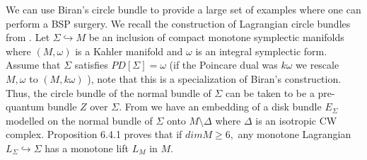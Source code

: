 \documentclass[11pt, oneside,dvipsnames]{amsart}
\newcommand{\<}{\langle}
\renewcommand{\>}{\rangle}
\newcommand{\bP}{\mathbb{P}}
\newcommand{\sm}{\ensuremath{\setminus}}
\newcommand{\abc}{{(a,b,c)}}
\newtheorem{prop}[Theorem]{Proposition}
\theoremstyle{definition}
\theoremstyle{definition}
\numberwithin{equation}{subsection}
\begin{document}

We can  use Biran's circle bundle to provide a large set of examples where one can perform a BSP surgery. We recall the construction of Lagrangian circle bundles from  \cite{b06,bc09}. Let $\Sigma \hookrightarrow M$ be an inclusion of compact monotone symplectic manifolds where $(M,\omega)$ is a Kahler manifold and $\omega$ is an integral symplectic form. Assume that $\Sigma$ satisfies $PD[\Sigma] = \omega$ (if the Poincare dual was $k\omega$ we  rescale $M,\omega$ to $(M,k\omega)$ ), note that this is a specialization of Biran's construction. Thus, the circle bundle of the normal bundle of $\Sigma$ can be taken to be a pre-quantum bundle $Z$ over $\Sigma.$ From \cite{b06} we have an embedding of a disk bundle $E_\Sigma$ modelled on the normal bundle of $\Sigma$ onto $M\sm \Delta$ where $\Delta$ is an isotropic CW complex. Proposition 6.4.1 \cite{bc09} proves that if $dim M \geq 6,$ any monotone Lagrangian $L_\Sigma \hookrightarrow \Sigma$ has a monotone lift $L_M$ in $M$.
\end{document}
